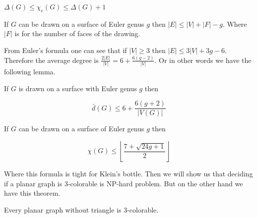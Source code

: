 \begin{thm}[Vizing]
	$\Delta(G) \leq \chi_e(G) \leq \Delta(G) + 1$
\end{thm}

\begin{thm}
	If $G$ can be drawn on a surface of Euler genus $g$ then $|E| \leq |V| + |F| - g$. Where $|F|$ is for the number of faces of the drawing.
\end{thm}

From Euler's formula one can see that if $|V| \geq 3$ then $|E| \leq 3 |V| + 3g - 6$. Therefore the average degree is $\frac{2|E|}{|V|} = 6 + \frac{6(g-2)}{|V|}$. Or in other words we have the following lemma.

\begin{lemma}
	If $G$ is drawn on a surface with Euler genus $g$ then
	
	$$
	\bar{d}(G) \leq 6 + \frac{6(g + 2)}{|V(G)|}
	$$
	\label{avg-deg}
\end{lemma}

\begin{thm}
	If $G$ can be drawn on a surface of Euler genus $g$ then
	
	$$
	\chi(G) \leq \left \lfloor \frac{7 + \sqrt{24 g + 1}}{2} \right \rfloor
	$$
\end{thm}

Where this formula is tight for Klein's bottle. Then we will show us that deciding if a planar graph is 3-colorable is NP-hard problem. But on the other hand we have this theorem.

\begin{thm}[Grötsch]
	Every planar graph without triangle is 3-colorable.
\end{thm}